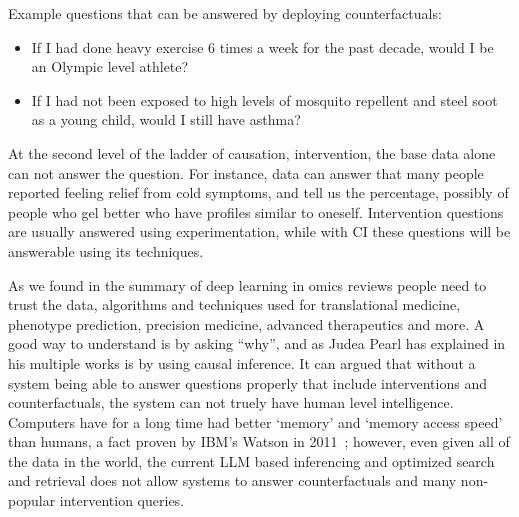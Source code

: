 Example questions that can be answered by deploying counterfactuals:
\begin{itemize}
    \item If I had done heavy exercise 6 times a week for the past decade, would I be an Olympic level athlete?
    \item If I had not been exposed to high levels of mosquito repellent and steel soot as a young child, would I still have asthma?
\end{itemize}

At the second level of the ladder of causation, intervention, the base data alone can not answer the question.
For instance, data can answer that many people reported feeling relief from cold symptoms, and tell us the percentage, possibly of people who gel better who have profiles similar to oneself.
Intervention questions are usually answered using experimentation, while with CI these questions will be answerable using its techniques.

As we found in the summary of deep learning in omics reviews people need to trust the data, algorithms and techniques used for translational medicine, phenotype prediction, precision medicine, advanced therapeutics and more.
A good way to understand is by asking ``why'', and as Judea Pearl \cite{Pearl:1995,Pearl:2009,Pearl:2019} has explained in his multiple works is by using causal inference.
It can argued that without a system being able to answer questions properly that include interventions and counterfactuals, the system can not truely have human level intelligence.
Computers have for a long time had better `memory' and `memory access speed' than humans, a fact proven by IBM's Watson in 2011~\cite{Ferrucci:2010_watson}; however, even given all of the data in the world, the current LLM based inferencing and optimized search and retrieval does not allow systems to answer counterfactuals and many non-popular intervention queries.
